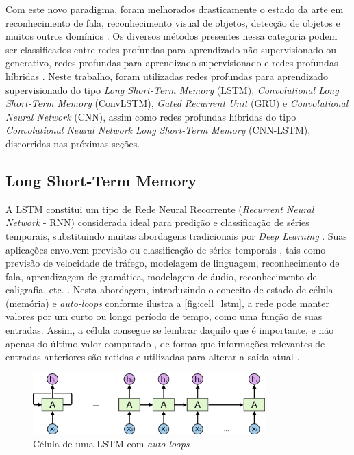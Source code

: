 Com este novo paradigma, foram melhorados drasticamente o estado da arte em reconhecimento de fala, reconhecimento visual de objetos, detecção de objetos e muitos outros domínios \cite{LeCun2015}. Os diversos métodos presentes nessa categoria podem ser classificados entre redes profundas para aprendizado não supervisionado ou generativo, redes profundas para aprendizado supervisionado e redes profundas híbridas \cite{Deng2014}. Neste trabalho, foram utilizadas redes  profundas para aprendizado supervisionado do tipo \textit{Long Short-Term Memory} (LSTM), \textit{Convolutional Long Short-Term Memory} (ConvLSTM), \textit{Gated Recurrent Unit} (GRU)  e \textit{Convolutional Neural Network} (CNN), assim como redes profundas híbridas do tipo \textit{Convolutional Neural Network Long Short-Term Memory} (CNN-LSTM), discorridas nas próximas seções.

\subsection{Long Short-Term Memory}

A LSTM constitui um tipo de Rede Neural Recorrente (\textit{Recurrent Neural Network} - RNN) considerada ideal para predição e classificação de séries temporais, substituindo muitas abordagens tradicionais por \textit{Deep Learning} \cite{Zaccone2017}. Suas aplicações envolvem previsão ou classificação de séries temporais \cite{Zaccone2017}, tais como previsão de velocidade de tráfego, modelagem de linguagem, reconhecimento de fala, aprendizagem de gramática, modelagem de áudio, reconhecimento de caligrafia, etc. \cite{Bianchi2017}. Nesta abordagem, introduzindo o conceito de estado de célula (memória) e \textit{auto-loops} conforme ilustra a \autoref{fig:cell_lstm}, a rede pode manter valores por um curto ou longo período de tempo, como uma função de suas entradas. Assim, a célula consegue se lembrar daquilo que é importante, e não apenas do último valor computado \cite{Jones2017}, de forma que informações relevantes de entradas anteriores são retidas e utilizadas para alterar a saída atual \cite{Zebin2018}.

\begin{figure}[h]
  \centering
  \caption{Célula de uma LSTM com \textit{auto-loops}}
   \label{fig:cell_lstm}
   \includegraphics[width=0.8\textwidth]{figuras/fig_8.png}
\end{figure}

